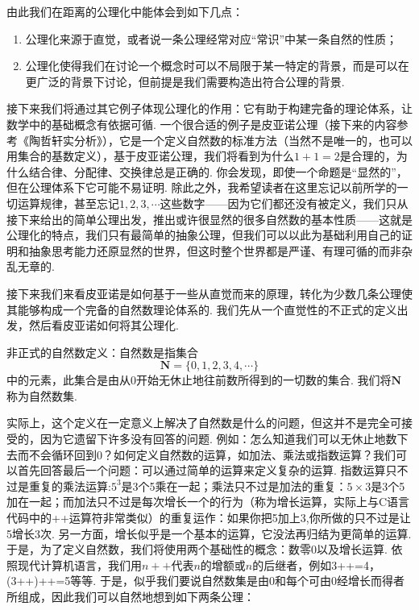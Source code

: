 由此我们在距离的公理化中能体会到如下几点：
\begin{enumerate}
    \item 公理化来源于直觉，或者说一条公理经常对应``常识''中某一条自然的性质；
    \item 公理化使得我们在讨论一个概念时可以不局限于某一特定的背景，而是可以在更广泛的背景下讨论，但前提是我们需要构造出符合公理的背景.
\end{enumerate}

接下来我们将通过其它例子体现公理化的作用：它有助于构建完备的理论体系，让数学中的基础概念有依据可循. 一个很合适的例子是皮亚诺公理（接下来的内容参考《陶哲轩实分析》），它是一个定义自然数的标准方法（当然不是唯一的，也可以用集合的基数定义），基于皮亚诺公理，我们将看到为什么$1+1=2$是合理的，为什么结合律、分配律、交换律总是正确的. 你会发现，即使一个命题是``显然的''，但在公理体系下它可能不易证明. 除此之外，我希望读者在这里忘记以前所学的一切运算规律，甚至忘记$1,2,3,\cdots$这些数字——因为它们都还没有被定义，我们只从接下来给出的简单公理出发，推出或许很显然的很多自然数的基本性质——这就是公理化的特点，我们只有最简单的抽象公理，但我们可以以此为基础利用自己的证明和抽象思考能力还原显然的世界，但这时整个世界都是严谨、有理可循的而非杂乱无章的.

接下来我们来看皮亚诺是如何基于一些从直觉而来的原理，转化为少数几条公理使其能够构成一个完备的自然数理论体系的. 我们先从一个直觉性的不正式的定义出发，然后看皮亚诺如何将其公理化.

\begin{definition*}
    非正式的自然数定义：自然数是指集合
    \[\mathbf{N}=\{0,1,2,3,4,\cdots\}\]
    中的元素，此集合是由从0开始无休止地往前数所得到的一切数的集合. 我们将$\mathbf{N}$称为自然数集.
\end{definition*}

实际上，这个定义在一定意义上解决了自然数是什么的问题，但这并不是完全可接受的，因为它遗留下许多没有回答的问题. 例如：怎么知道我们可以无休止地数下去而不会循环回到0？如何定义自然数的运算，如加法、乘法或指数运算？我们可以首先回答最后一个问题：可以通过简单的运算来定义复杂的运算. 指数运算只不过是重复的乘法运算:$5^3$是3个5乘在一起；乘法只不过是加法的重复：$5\times 3$是3个5加在一起；而加法只不过是每次增长一个的行为（称为增长运算，实际上与C语言代码中的++运算符非常类似）的重复运作：如果你把5加上3,你所做的只不过是让5增长3次. 另一方面，增长似乎是一个基本的运算，它没法再归结为更简单的运算. 于是，为了定义自然数，我们将使用两个基础性的概念：数零0以及增长运算. 依照现代计算机语言，我们用$n++$代表$n$的增额或$n$的后继者，例如3++=4，(3++)++=5等等. 于是，似乎我们要说自然数集是由0和每个可由0经增长而得者所组成，因此我们可以自然地想到如下两条公理：

